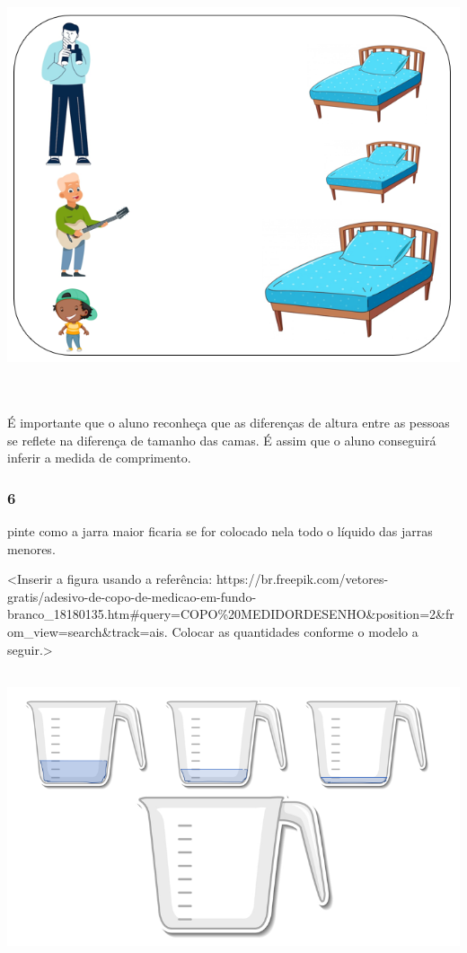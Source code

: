 \includegraphics[width=6.28790in,height=4.93257in]{media/image27.png}

É importante que o aluno reconheça que as diferenças de
altura entre as pessoas se reflete na diferença de tamanho das camas.
É assim que o aluno conseguirá inferir a medida de comprimento.

\subsubsection{6}\label{section-32}

pinte como a jarra maior ficaria se for colocado nela todo o líquido das
jarras menores.

\protect\hypertarget{_heading=h.gjdgxs}{}{}\textless{}Inserir a figura
usando a referência:
https://br.freepik.com/vetores-gratis/adesivo-de-copo-de-medicao-em-fundo-branco\_18180135.htm\#query=COPO\%20MEDIDORDESENHO\&position=2\&from\_view=search\&track=ais.
Colocar as quantidades conforme o modelo a seguir.\textgreater{}

\includegraphics[width=5.90556in,height=3.37222in]{media/image28.png}

